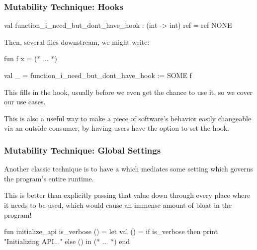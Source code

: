 \documentclass[aspectratio=169]{beamer}
\begin{document}
\begin{frame}[fragile]
  \frametitle{Mutability Technique: Hooks}


  \pause
  \vspace{\fill}

  \begin{codeblock}
    val function_i_need_but_dont_have_hook :
      (int -> int) ref = ref NONE
  \end{codeblock}

  \pause
  \vspace{\fill}

  Then, several files downstream, we might write:
  \begin{codeblock}
    fun f x = (* ... *)

    val _ = function_i_need_but_dont_have_hook := SOME f
  \end{codeblock}

  \pause
  \vspace{\fill}

  This fills in the hook, usually before we even get the chance to use it, so
  we cover our use cases.

  \pause
  \vspace{\fill}

  This is also a useful way to make a piece of software's behavior easily
  changeable via an outside consumer, by having users have the option to
  set the hook.
\end{frame}

\begin{frame}[fragile]
  \frametitle{Mutability Technique: Global Settings}

  Another classic technique is to have a  which mediates some
  setting which governs the program's entire runtime.

  \pause
  \vspace{\fill}

  This is better than explicitly passing that value down through every place where
  it needs to be used, which would cause an immense amount of bloat in the program!

  \pause
  \vspace{\fill}

  \begin{codeblock}
    fun initialize_api is_verbose () =
      let
        val () = if is_verbose then
                   print "Initializing API...\n"
                 else ()
      in
        (* ... *)
      end
  \end{codeblock}
\end{frame}
\end{document}
